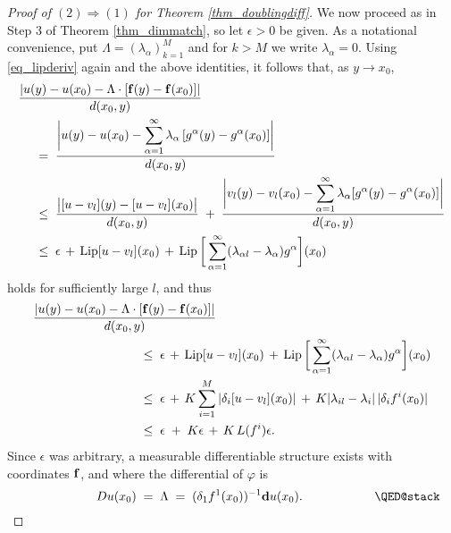 \documentclass[reqno]{amsart}
\theoremstyle{plain}
\theoremstyle{definition}
\theoremstyle{remark}
\numberwithin{equation}{section}
\renewcommand{\a}{\alpha}
\renewcommand{\d}{\delta}
\newcommand{\e}{\epsilon}
\newcommand{\Lip}{\operatorname{Lip}}
\begin{document}
\begin{proof}[Proof of $(2) \Rightarrow (1)$ for Theorem \ref{thm_doublingdiff}]
We now proceed as in Step 3 of Theorem \ref{thm_dimmatch}, so let $\e > 0$ be given.  As a notational convenience, 
put $\Lambda = (\lambda_\a)_{k=1}^M$ and for $k > M$ we write $\lambda_\a = 0$.  Using \eqref{eq_lipderiv} again and the above identities, it follows that, as $y \to x_0$,
\begin{equation*}
\begin{split}
&
\frac{\left|u(y) - u(x_0) - 
\Lambda \cdot [{\bf f}(y)- {\bf f}(x_0)] 
\right|}{d(x_0,y)} 
\\ &
\hspace{.15in} \;=\;
\frac{\bigg|u(y) - u(x_0) - \displaystyle{
\sum_{\a=1}^\infty \lambda_\a \, [g^\a(y)-g^\a(x_0)] 
} \bigg|}{d(x_0,y)} 
\\ &
\hspace{.15in} \;\leq\;
\frac{\big| [u - v_l](y) - [u - v_l](x_0)\big|}{d(x_0,y)} \;+\;
\frac{\bigg|v_l(y) - v_l(x_0) - \displaystyle{
\sum_{\a=1}^\infty \lambda_\a [g^\a(y)-g^\a(x_0)] 
} \bigg|}{d(x_0,y)} \\ &
\hspace{.15in} \;\leq\;
\e \,+\, \Lip[u - v_l](x_0) \,+\, \Lip\bigg[\sum_{\a=1}^\infty (\lambda_{\a l} - \lambda_\a) g^\a\bigg](x_0)
\end{split}
\end{equation*}
holds for sufficiently large $l$, and thus
\begin{equation*}
\begin{split}
&
\frac{\left|u(y) - u(x_0) - 
\Lambda \cdot [{\bf f}(y)- {\bf f}(x_0)] 
\right|}{d(x_0,y)} 
\\ &
\hspace{1.15in} \;\leq\;
\e \,+\, \Lip[u - v_l](x_0) \,+\, \Lip\bigg[\sum_{\a=1}^\infty (\lambda_{\a l} - \lambda_\a) g^\a\bigg](x_0) \\ &
\hspace{1.15in} \;\leq\;
\e \,+\, 
K\sum_{i=1}^M \left|\d_i[u - v_l](x_0)\right| \,+\, 
K|\lambda_{il} - \lambda_i| \, |\d_if^i(x_0)| \\ &
\hspace{1.15in} \;\leq\;
\e \;+\; K\e \,+\, K \, L(f^i) \e.
\end{split}
\end{equation*}
Since $\e$ was arbitrary, a measurable differentiable structure exists with coordinates ${\bf f}$, and where the differential of $\varphi$ is 
$$
\hspace{.8in}
Du(x_0) \;=\; \Lambda \;=\;
(\d_1f^1(x_0))^{-1}{\bf d}u(x_0).
\hspace{.8in}
\qedhere
$$
\end{proof}
\end{document}
